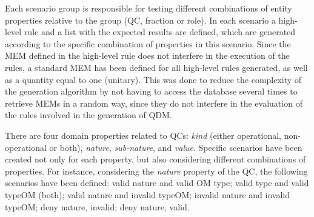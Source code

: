 \documentclass[AMA,STIX1COL]{WileyNJD-v2}
\begin{document}

Each scenario group is responsible for testing different combinations of entity properties relative to the group (QC, fraction or role). In each scenario a high-level rule and a list with the expected results are defined, which are generated according to the specific combination of properties in this scenario. Since the MEM defined in the high-level rule does not interfere in the execution of the rules, a standard MEM has been defined for all high-level rules generated, as well as a quantity equal to one (unitary). This was done to reduce the complexity of the generation algorithm by not having to access the database several times to retrieve MEMs in a random way, since they do not interfere in the evaluation of the rules involved in the generation of QDM.


There are four domain properties related to QCs:
\emph{kind} (either operational, non-operational or both),
\emph{nature}, \emph{sub-nature}, and \emph{value}. Specific scenarios have been created not only for each property, but also considering different
combinations of properties. For instance, considering the \emph{nature} property of the QC, the following scenarios have been defined: valid nature and valid OM type; valid type and valid typeOM (both); valid nature and invalid typeOM; invalid nature and invalid typeOM; deny nature, invalid; deny nature, valid.    

\end{document}
